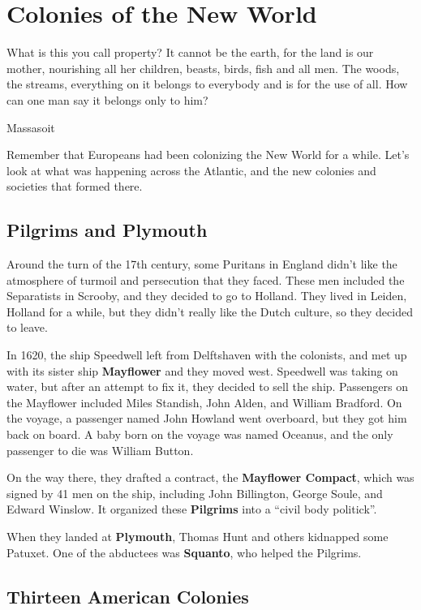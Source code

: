 \chapter{Colonies of the New World}

\epigraph{%
  What is this you call property?
  It cannot be the earth, for the land is our mother,
  nourishing all her children, beasts, birds, fish and all men.
  The woods, the streams, everything on it belongs to everybody and is for the use of all.
  How can one man say it belongs only to him?
}{Massasoit}

Remember that Europeans had been colonizing the New World for a while.
Let's look at what was happening across the Atlantic,
and the new colonies and societies that formed there.

\section{Pilgrims and Plymouth}

Around the turn of the 17th century,
some Puritans in England didn't like the atmosphere of turmoil and persecution that they faced.
These men included the Separatists in Scrooby, and they decided to go to Holland.
They lived in Leiden, Holland for a while, but they didn't really like the Dutch culture,
so they decided to leave.

In 1620, the ship Speedwell left from Delftshaven with the colonists,
and met up with its sister ship \textbf{Mayflower} and they moved west.
Speedwell was taking on water, but after an attempt to fix it, they decided to sell the ship.
Passengers on the Mayflower included Miles Standish, John Alden, and William Bradford.
On the voyage, a passenger named John Howland went overboard, but they got him back on board.
A baby born on the voyage was named Oceanus, and the only passenger to die was William Button.

On the way there, they drafted a contract, the \textbf{Mayflower Compact},
which was signed by 41 men on the ship, including John Billington, George Soule, and Edward Winslow.
It organized these \textbf{Pilgrims} into a ``civil body politick''.

When they landed at \textbf{Plymouth}, Thomas Hunt and others kidnapped some Patuxet.
One of the abductees was \textbf{Squanto}, who helped the Pilgrims.

\section{Thirteen American Colonies}


